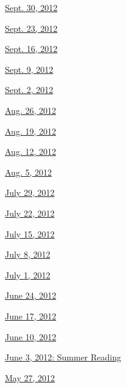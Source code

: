 \href{http://www.nytimes3xbfgragh.onion/indexes/2012/09/30/books/review/index.html}{Sept.
30, 2012}

\href{http://www.nytimes3xbfgragh.onion/indexes/2012/09/23/books/review/index.html}{Sept.
23, 2012}

\href{http://www.nytimes3xbfgragh.onion/indexes/2012/09/16/books/review/index.html}{Sept.
16, 2012}

\href{http://www.nytimes3xbfgragh.onion/indexes/2012/09/09/books/review/index.html}{Sept.
9, 2012}

\href{http://www.nytimes3xbfgragh.onion/indexes/2012/09/02/books/review/index.html}{Sept.
2, 2012}

\href{http://www.nytimes3xbfgragh.onion/indexes/2012/08/26/books/review/index.html}{Aug.
26, 2012}

\href{http://www.nytimes3xbfgragh.onion/indexes/2012/08/19/books/review/index.html}{Aug.
19, 2012}

\href{http://www.nytimes3xbfgragh.onion/indexes/2012/08/12/books/review/index.html}{Aug.
12, 2012}

\href{http://www.nytimes3xbfgragh.onion/indexes/2012/08/05/books/review/index.html}{Aug.
5, 2012}

\href{http://www.nytimes3xbfgragh.onion/indexes/2012/07/29/books/review/index.html}{July
29, 2012}

\href{http://www.nytimes3xbfgragh.onion/indexes/2012/07/22/books/review/index.html}{July
22, 2012}

\href{http://www.nytimes3xbfgragh.onion/indexes/2012/07/15/books/review/index.html}{July
15, 2012}

\href{http://www.nytimes3xbfgragh.onion/indexes/2012/07/08/books/review/index.html}{July
8, 2012}

\href{http://www.nytimes3xbfgragh.onion/indexes/2012/07/01/books/review/index.html}{July
1, 2012}

\href{http://www.nytimes3xbfgragh.onion/indexes/2012/06/24/books/review/index.html}{June
24, 2012}

\href{http://www.nytimes3xbfgragh.onion/indexes/2012/06/17/books/review/index.html}{June
17, 2012}

\href{http://www.nytimes3xbfgragh.onion/indexes/2012/06/10/books/review/index.html}{June
10, 2012}

\href{http://www.nytimes3xbfgragh.onion/indexes/2012/06/03/books/review/index.html}{June
3, 2012: Summer Reading}

\href{http://www.nytimes3xbfgragh.onion/indexes/2012/05/27/books/review/index.html}{May
27, 2012}

